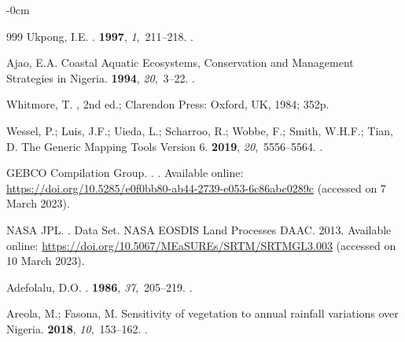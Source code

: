 \documentclass[jmse,article,accept,pdftex,moreauthors]{Definitions/mdpi}
\begin{document}
\begin{adjustwidth}{-\extralength}{0cm}
\begin{thebibliography}{999}
Ukpong, I.E.
.
 {\bf 1997}, {\em 1},~211--218.
.

Ajao, E.A.
\newblock Coastal Aquatic Ecosystems, Conservation and Management Strategies in
  Nigeria.
 {\bf 1994}, {\em 20},~3--22.
.

Whitmore, T.
, 2nd ed.; Clarendon Press:
  Oxford, UK,  1984;
\newblock 352p.

Wessel, P.; Luis, J.F.; Uieda, L.; Scharroo, R.; Wobbe, F.; Smith, W.H.F.;
  Tian, D.
\newblock The Generic Mapping Tools Version 6.
 {\bf 2019}, {\em 20},~5556--5564.
.

{GEBCO Compilation Group}.
.
.
\newblock Available online: {\url{https://doi.org/10.5285/e0f0bb80-ab44-2739-e053-6c86abc0289c}} (accessed on 7 March 2023). %

{NASA JPL}.
.
\newblock Data Set. NASA EOSDIS Land Processes DAAC. 2013.
  Available online: {\url{https://doi.org/10.5067/MEaSUREs/SRTM/SRTMGL3.003}} (accessed on 10 March 2023).

Adefolalu, D.O.
.
 {\bf 1986}, {\em 37},~205--219.
.

Areola, M.; Fasona, M.
\newblock Sensitivity of vegetation to annual rainfall variations over Nigeria.
 {\bf 2018}, {\em
  10},~153--162.
.


\end{thebibliography}
\end{adjustwidth}
\end{document}
